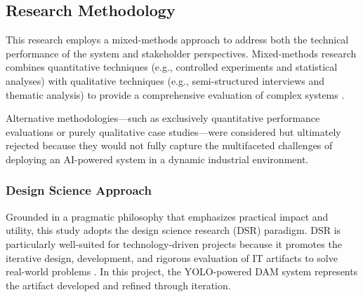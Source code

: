 \documentclass[a4paper,10pt,twocolumn]{article}
\numberwithin{figure}{section}
\numberwithin{table}{section}
\begin{document}
\subsection{Research Methodology}
This research employs a mixed-methods approach to address both the 
technical performance of the system and stakeholder perspectives. 
Mixed-methods research combines quantitative techniques 
(e.g., controlled experiments and statistical analyses) with 
qualitative techniques (e.g., semi-structured interviews and thematic analysis)
to provide a comprehensive evaluation of complex systems \citep{johnson2004mixed}.

Alternative methodologies—such as exclusively quantitative performance evaluations 
or purely qualitative case studies—were considered but ultimately rejected because 
they would not fully capture the multifaceted challenges of deploying an AI-powered 
system in a dynamic industrial environment.

\vspace{0.3cm}
\subsubsection{Design Science Approach}
\vspace{0.3cm}


Grounded in a pragmatic philosophy that emphasizes practical impact and utility, 
this study adopts the design science research (DSR) paradigm. DSR is particularly 
well-suited for technology-driven projects because it promotes the iterative design, 
development, and rigorous evaluation of IT artifacts to solve 
real-world problems \citep{hevner2004design}. In this project, 
the YOLO-powered DAM system represents 
the artifact developed and refined through iteration.

\vspace{0.3cm}
\end{document}
